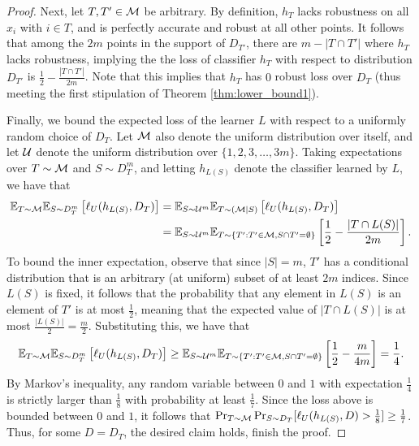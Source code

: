 \begin{proof}
Next, let $T, T' \in \mathcal M$ be arbitrary. By definition, $h_T$ lacks robustness on all $x_i$ with $i \in T$, and is perfectly accurate and robust at all other points. It follows that among the $2m$ points in the support of $D_{T'}$, there are $m - |T \cap T'|$ where $h_T$ lacks robustness, implying the the loss of classifier $h_T$ with respect to distribution $D_{T'}$ is $\frac{1}{2} - \frac{|T \cap T'|}{2m}$. Note that this implies that $h_T$ has $0$ robust loss over $D_T$ (thus meeting the first stipulation of Theorem \ref{thm:lower_bound1}). 

Finally, we bound the expected loss of the learner $L$ with respect to a uniformly random choice of $D_T$. Let $\mathcal M$ also denote the uniform distribution over itself, and let $\mathcal U$ denote the uniform distribution over $\{1, 2, 3, \dots, 3m\}$. Taking expectations over $T \sim \mathcal M$ and $S \sim D_T^m$, and letting $h_{L(S)}$ denote the classifier learned by $L$, we have that 
\begin{equation*}
\begin{split}
\mathbb{E}_{T \sim \mathcal M} \mathbb{E}_{S \sim D_T^m} \left[\ell_U(h_{L(S)}, D_T)\right] &= \mathbb{E}_{S \sim \mathcal U^m} \mathbb{E}_{T \sim (\mathcal M | S)} \left[\ell_U(h_{L(S)}, D_T)\right] \\
&= \mathbb{E}_{S \sim \mathcal U^m} \mathbb{E}_{T \sim \{T': T' \in \mathcal M, S \cap T' = \emptyset\}}\left[ \frac{1}{2} - \frac{|T \cap L(S)|}{2m} \right].\\
\end{split}
\end{equation*}
To bound the inner expectation, observe that since $|S| = m$, $T'$ has a conditional distribution that is an arbitrary (at uniform) subset of at least $2m$ indices. Since $L(S)$ is fixed, it follows that the probability that any element in $L(S)$ is an element of $T'$ is at most $\frac{1}{2}$, meaning that the expected value of $|T \cap L(S)|$ is at most $\frac{|L(S)|}{2} = \frac{m}{2}$. Substituting this, we have that 
\begin{equation*}
\begin{split}
\mathbb{E}_{T \sim \mathcal M} \mathbb{E}_{S \sim D_T^m} \left[\ell_U(h_{L(S)}, D_T)\right] \geq \mathbb{E}_{S \sim \mathcal U^m} \mathbb{E}_{T \sim \{T': T' \in \mathcal M, S \cap T' = \emptyset\}}\left[ \frac{1}{2} - \frac{m}{4m} \right] = \frac{1}{4}.\\
\end{split}
\end{equation*}
By Markov's inequality, any random variable between $0$ and $1$ with expectation $\frac{1}{4}$ is strictly larger than $\frac{1}{8}$ with probability at least $\frac{1}{7}$. Since the loss above is bounded between $0$ and $1$, it follows that $\Pr_{T \sim \mathcal M}\Pr_{S \sim D_T} [\ell_U(h_{L(S)}, D) > \frac{1}{8}] \geq \frac{1}{7}$. Thus, for some $D = D_T$, the desired claim holds, finish the proof.
\end{proof}

